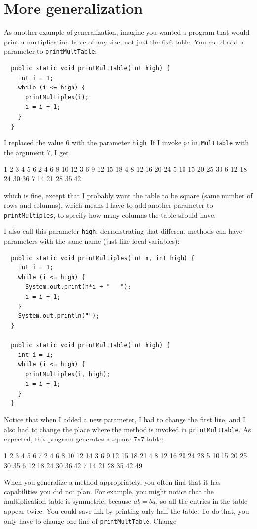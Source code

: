 \section{More generalization}

As another example of generalization, imagine you wanted
a program that would print a multiplication table of any
size, not just the 6x6 table.  You could add a parameter to
{\tt printMultTable}:

\begin{lstlisting}
  public static void printMultTable(int high) {
    int i = 1;
    while (i <= high) {
      printMultiples(i);
      i = i + 1;
    }
  }
\end{lstlisting}
%
I replaced the value 6 with the parameter {\tt high}.  If I
invoke {\tt printMultTable} with the argument 7, I get

\begin{stdout}
1   2   3   4   5   6
2   4   6   8   10   12
3   6   9   12   15   18
4   8   12   16   20   24
5   10   15   20   25   30
6   12   18   24   30   36
7   14   21   28   35   42
\end{stdout}
%
which is fine, except that I probably want the table to
be square (same number of rows and columns), which means
I have to add another parameter to {\tt printMultiples},
to specify how many columns the table should have.

I also call this parameter {\tt high},
demonstrating that different methods can have parameters
with the same name (just like local variables):

\begin{lstlisting}
  public static void printMultiples(int n, int high) {
    int i = 1;
    while (i <= high) {
      System.out.print(n*i + "   ");
      i = i + 1;
    }
    System.out.println("");
  }

  public static void printMultTable(int high) {
    int i = 1;
    while (i <= high) {
      printMultiples(i, high);
      i = i + 1;
    }
  }
\end{lstlisting}
%
Notice that when I added a new parameter, I had to change the first
line, and I also had to
change the place where the method is invoked in {\tt printMultTable}.
As expected, this program generates a square 7x7 table:

\begin{stdout}
1   2   3   4   5   6   7
2   4   6   8   10   12   14
3   6   9   12   15   18   21
4   8   12   16   20   24   28
5   10   15   20   25   30   35
6   12   18   24   30   36   42
7   14   21   28   35   42   49
\end{stdout}
%
When you generalize a method appropriately, you often find
that it has capabilities you did not plan.
For example, you might notice that the multiplication table
is symmetric, because $ab = ba$, so all the entries in the
table appear twice.  You could save ink by printing only
half the table.  To do that, you only have to change one
line of {\tt printMultTable}.  Change

